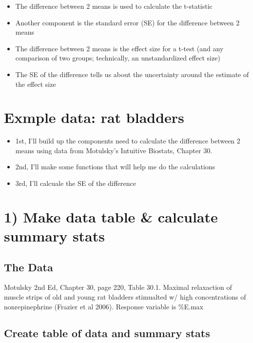\documentclass[
]{book}
\providecommand{\tightlist}{%
  \setlength{\itemsep}{0pt}\setlength{\parskip}{0pt}}
\begin{document}
\begin{itemize}
\tightlist
\item
  The difference between 2 means is used to calculate the t-statistic
\item
  Another component is the standard error (SE) for the difference between 2 means
\item
  The difference between 2 means is the effect size for a t-test (and any comparison of two groups; technically, an unstandardized effect size)
\item
  The SE of the difference tells us about the uncertainty around the estimate of the effect size
\end{itemize}

\hypertarget{exmple-data-rat-bladders}{%
\chapter{Exmple data: rat bladders}\label{exmple-data-rat-bladders}}

\begin{itemize}
\tightlist
\item
  1st, I'll build up the components need to calculate the difference between 2 means using data from Motulsky's Intuitive Biostats, Chapter 30.
\item
  2nd, I'll make some functions that will help me do the calculations
\item
  3rd, I'll calcuale the SE of the difference
\end{itemize}

\hypertarget{make-data-table-calculate-summary-stats}{%
\chapter{1) Make data table \& calculate summary stats}\label{make-data-table-calculate-summary-stats}}

\hypertarget{the-data-1}{%
\section{The Data}\label{the-data-1}}

Motulsky 2nd Ed, Chapter 30, page 220, Table 30.1. Maximal relaxaction of muscle strips of old and young rat bladders stimualted w/ high concentrations of nonrepinephrine (Frazier et al 2006). Response variable is \%E.max

\hypertarget{create-table-of-data-and-summary-stats}{%
\section{Create table of data and summary stats}\label{create-table-of-data-and-summary-stats}}
\end{document}

